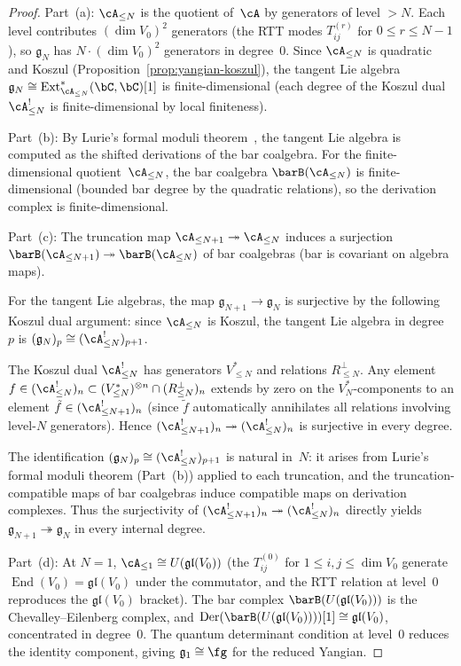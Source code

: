 \begin{proof}
Part~(a):
$\cA_{\leq N}$ is the quotient of~$\cA$ by generators of
level $> N$.  Each level contributes $(\dim V_0)^2$
generators (the RTT modes $T_{ij}^{(r)}$ for
$0 \leq r \leq N-1$), so $\mathfrak{g}_N$ has
$N \cdot (\dim V_0)^2$ generators in degree~$0$.
Since $\cA_{\leq N}$ is quadratic and Koszul
(Proposition~\ref{prop:yangian-koszul}), the tangent Lie
algebra $\mathfrak{g}_N \cong
\operatorname{Ext}^*_{\cA_{\leq N}}(\bC, \bC)[1]$ is
finite-dimensional (each degree of the Koszul dual
$\cA_{\leq N}^!$ is finite-dimensional by local finiteness).

Part~(b):
By Lurie's formal moduli theorem~\cite{LurieDAGX}, the tangent
Lie algebra is computed as the shifted derivations of the bar
coalgebra.  For the finite-dimensional quotient~$\cA_{\leq N}$,
the bar coalgebra $\barB(\cA_{\leq N})$ is finite-dimensional
(bounded bar degree by the quadratic relations), so
the derivation complex is finite-dimensional.

Part~(c):
The truncation map $\cA_{\leq N+1} \twoheadrightarrow \cA_{\leq N}$
induces a surjection
$\barB(\cA_{\leq N+1}) \twoheadrightarrow \barB(\cA_{\leq N})$
of bar coalgebras (bar is covariant on algebra maps).

For the tangent Lie algebras, the map
$\mathfrak{g}_{N+1} \to \mathfrak{g}_N$ is surjective by the
following Koszul dual argument: since $\cA_{\leq N}$ is Koszul,
the tangent Lie algebra in degree~$p$ is
$(\mathfrak{g}_N)_p \cong (\cA_{\leq N}^!)_{p+1}$.

The Koszul dual $\cA_{\leq N}^!$ has generators
$V_{\leq N}^*$ and relations $R_{\leq N}^\perp$.
Any element $f \in (\cA_{\leq N}^!)_n
\subset (V_{\leq N}^*)^{\otimes n} \cap (R_{\leq N}^\perp)_n$
extends by zero on the $V_N^*$-components to an element
$\tilde{f} \in (\cA_{\leq N+1}^!)_n$
(since $\tilde{f}$ automatically annihilates all
relations involving level-$N$ generators).
Hence $(\cA_{\leq N+1}^!)_n \twoheadrightarrow (\cA_{\leq N}^!)_n$
is surjective in every degree.

The identification
$(\mathfrak{g}_N)_p \cong (\cA_{\leq N}^!)_{p+1}$ is natural
in~$N$: it arises from Lurie's formal moduli theorem (Part~(b))
applied to each truncation, and the truncation-compatible maps of
bar coalgebras induce compatible maps on derivation complexes.
Thus the surjectivity of $(\cA_{\leq N+1}^!)_n \twoheadrightarrow
(\cA_{\leq N}^!)_n$ directly yields
$\mathfrak{g}_{N+1} \twoheadrightarrow \mathfrak{g}_N$ in every
internal degree.

Part~(d):
At $N = 1$, $\cA_{\leq 1} \cong U(\mathfrak{gl}(V_0))$ (the
$T_{ij}^{(0)}$ for $1 \leq i,j \leq \dim V_0$ generate
$\operatorname{End}(V_0) = \mathfrak{gl}(V_0)$ under the
commutator, and the RTT relation at level~$0$ reproduces the
$\mathfrak{gl}(V_0)$ bracket).  The bar complex
$\barB(U(\mathfrak{gl}(V_0)))$ is the Chevalley--Eilenberg complex,
and $\operatorname{Der}(\barB(U(\mathfrak{gl}(V_0))))[1]
\cong \mathfrak{gl}(V_0)$, concentrated in degree~$0$.
The quantum determinant condition at level~$0$ reduces the
identity component, giving $\mathfrak{g}_1 \cong \fg$ for
the reduced Yangian.
\end{proof}

